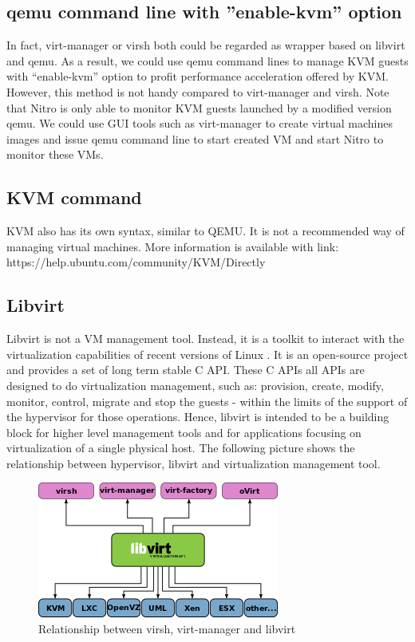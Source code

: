 \subsection{qemu command line with ''enable-kvm'' option}
In fact, virt-manager or virsh both could be regarded as wrapper based on libvirt and qemu. 
As a result, we could use qemu command lines to manage KVM guests with “enable-kvm” option to profit performance acceleration offered by KVM. 
However, this method is not handy compared to virt-manager and virsh. 
Note that Nitro is only able to monitor KVM guests launched by a modified version qemu. 
We could use GUI tools such as virt-manager to create virtual machines images and issue qemu command line to start created VM and start Nitro to monitor these VMs.

\subsection{KVM command}
KVM also has its own syntax, similar to QEMU. 
It is not a recommended way of managing virtual machines. 
More information is available with link: https://help.ubuntu.com/community/KVM/Directly

\subsection{Libvirt}
Libvirt is not a VM management tool. 
Instead, it is a toolkit to interact with the virtualization capabilities of recent versions of Linux \citep{Reference23}. 
It is an open-source project and provides a set of long term stable C API. 
These C APIs all APIs are designed to do virtualization management, such as: 
provision, create, modify, monitor, control, migrate and stop the guests - within the limits of the support of the hypervisor for those operations. 
Hence, libvirt is intended to be a building block for higher level management tools and for applications focusing on virtualization of a single physical host. 
The following picture shows the relationship between hypervisor, libvirt and virtualization management tool.

\begin{figure}[htbp]
	\centering
		\includegraphics[scale = 1.2]{Figures/Figure8.png}
	\caption[Relationship between virsh, virt-manager and libvirt]{Relationship between virsh, virt-manager and libvirt}
	\label{fig:Relationship between virsh, virt-manager and libvirt}
\end{figure}

